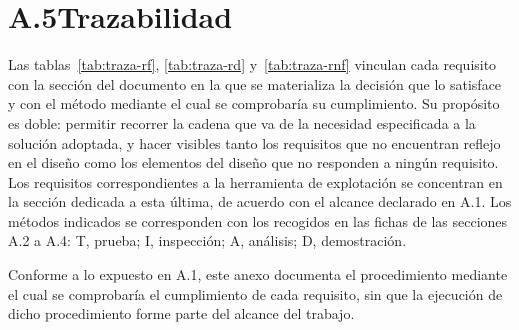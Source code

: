 %
%


\section*{A.5\quad Trazabilidad}

Las tablas~\ref{tab:traza-rf}, \ref{tab:traza-rd} y~\ref{tab:traza-rnf} vinculan
cada requisito con la sección del documento en la que se materializa la decisión
que lo satisface y con el método mediante el cual se comprobaría su cumplimiento.
Su propósito es doble: permitir recorrer la cadena que va de la necesidad
especificada a la solución adoptada, y hacer visibles tanto los requisitos que no
encuentran reflejo en el diseño como los elementos del diseño que no responden a
ningún requisito. Los requisitos correspondientes a la herramienta de explotación
se concentran en la sección dedicada a esta última, de acuerdo con el alcance
declarado en A.1. Los métodos indicados se corresponden con los recogidos en las
fichas de las secciones A.2 a A.4: T, prueba; I, inspección; A, análisis; D,
demostración.

Conforme a lo expuesto en A.1, este anexo documenta el procedimiento mediante el
cual se comprobaría el cumplimiento de cada requisito, sin que la ejecución de
dicho procedimiento forme parte del alcance del trabajo.


